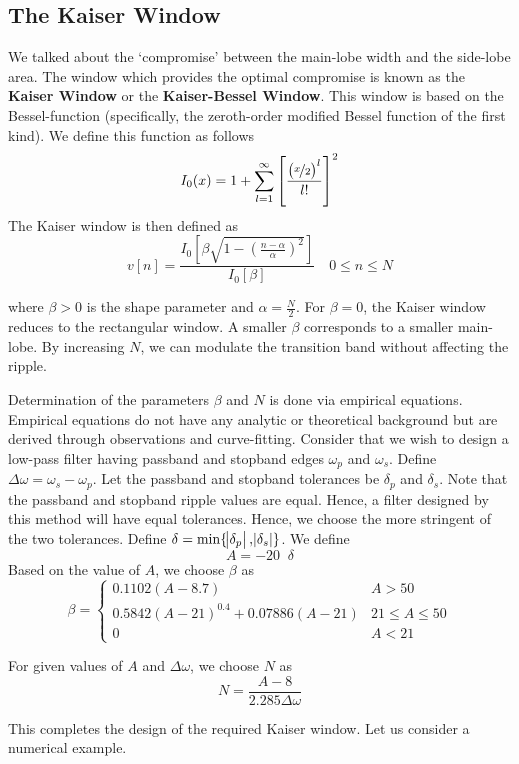 \documentclass{article}
\theoremstyle{definition}
\newcommand\ddfrac[2]{\frac{\displaystyle #1}{\displaystyle #2}}
\newcommand*{\logten}{\mathop{\log_{10}}}
\begin{document}
\subsection{The Kaiser Window}

We talked about the `compromise' between the main-lobe width and the side-lobe area. The window which provides the optimal compromise is known as the \textbf{Kaiser Window} or the \textbf{Kaiser-Bessel Window}. This window is based on the Bessel-function (specifically, the zeroth-order modified Bessel function of the first kind). We define this function as follows
\[
    I_0(x) = 1 + \sum_{l =1}^{\infty} \left[ \ddfrac{\left( \nicefrac{x}{2}\right)^l}{l!}\right]^2
\]
The Kaiser window is then defined as
\[
    v[n] = \frac{I_0 \left[ \beta\sqrt{ 1 - \left( \frac{n - \alpha}{\alpha} \right)^2}\right]}{I_0[\beta]} \quad 0 \leq n \leq N
\]

where $\beta > 0$ is the shape parameter and $\alpha = \frac{N}{2}$. For $\beta=0$, the Kaiser window reduces to the rectangular window. A smaller $\beta$ corresponds to a smaller main-lobe. By increasing $N$, we can modulate the transition band without affecting the ripple. \medskip

Determination of the parameters $\beta$ and $N$ is done via empirical equations. Empirical equations do not have any analytic or theoretical background but are derived through observations and curve-fitting. Consider that we wish to design a low-pass filter having passband and stopband edges $\omega_p$ and $\omega_s$. Define $\Delta \omega = \omega_s - \omega_p$. Let the passband and stopband tolerances be $\delta_p$ and $\delta_s$. Note that the passband and stopband ripple values are equal. Hence, a filter designed by this method will have equal tolerances. Hence, we choose the more stringent of the two tolerances. Define $\delta = \min \{ \abs{\delta_p} , \abs{\delta_s} \}$. We define 
\[
    A = -20 \logten \delta
\]
Based on the value of $A$, we choose $\beta$ as 
\[
    \beta = 
    \begin{cases}
        0.1102 (A - 8.7) & A > 50 \\
        0.5842 (A - 21)^{0.4} + 0.07886(A-21) & 21 \leq A \leq 50 \\
        0 & A < 21
    \end{cases}
\]

For given values of $A$ and $\Delta \omega$, we choose $N$ as
\[
    N = \frac{A - 8}{2.285 \Delta \omega}
\]

This completes the design of the required Kaiser window. Let us consider a numerical example. \smallskip
\end{document}
